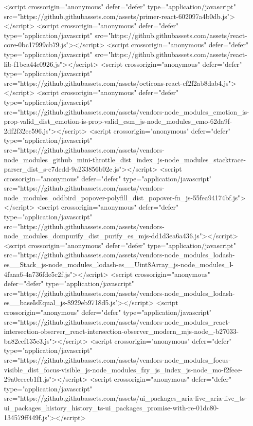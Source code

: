   <script crossorigin="anonymous" defer="defer" type="application/javascript" src="https://github.githubassets.com/assets/primer-react-602097a4b0db.js"></script>
<script crossorigin="anonymous" defer="defer" type="application/javascript" src="https://github.githubassets.com/assets/react-core-0bc17999cb79.js"></script>
<script crossorigin="anonymous" defer="defer" type="application/javascript" src="https://github.githubassets.com/assets/react-lib-f1bca44e0926.js"></script>
<script crossorigin="anonymous" defer="defer" type="application/javascript" src="https://github.githubassets.com/assets/octicons-react-cf2f2ab8dab4.js"></script>
<script crossorigin="anonymous" defer="defer" type="application/javascript" src="https://github.githubassets.com/assets/vendors-node_modules_emotion_is-prop-valid_dist_emotion-is-prop-valid_esm_js-node_modules_emo-62da9f-2df2f32ec596.js"></script>
<script crossorigin="anonymous" defer="defer" type="application/javascript" src="https://github.githubassets.com/assets/vendors-node_modules_github_mini-throttle_dist_index_js-node_modules_stacktrace-parser_dist_s-e7dcdd-9a233856b02c.js"></script>
<script crossorigin="anonymous" defer="defer" type="application/javascript" src="https://github.githubassets.com/assets/vendors-node_modules_oddbird_popover-polyfill_dist_popover-fn_js-55fea94174bf.js"></script>
<script crossorigin="anonymous" defer="defer" type="application/javascript" src="https://github.githubassets.com/assets/vendors-node_modules_dompurify_dist_purify_es_mjs-dd1d3ea6a436.js"></script>
<script crossorigin="anonymous" defer="defer" type="application/javascript" src="https://github.githubassets.com/assets/vendors-node_modules_lodash-es__Stack_js-node_modules_lodash-es__Uint8Array_js-node_modules_l-4faaa6-4a736fde5c2f.js"></script>
<script crossorigin="anonymous" defer="defer" type="application/javascript" src="https://github.githubassets.com/assets/vendors-node_modules_lodash-es__baseIsEqual_js-8929eb9718d5.js"></script>
<script crossorigin="anonymous" defer="defer" type="application/javascript" src="https://github.githubassets.com/assets/vendors-node_modules_react-intersection-observer_react-intersection-observer_modern_mjs-node_-b27033-ba82cef135e3.js"></script>
<script crossorigin="anonymous" defer="defer" type="application/javascript" src="https://github.githubassets.com/assets/vendors-node_modules_focus-visible_dist_focus-visible_js-node_modules_fzy_js_index_js-node_mo-f2fece-29a0ceccb1f1.js"></script>
<script crossorigin="anonymous" defer="defer" type="application/javascript" src="https://github.githubassets.com/assets/ui_packages_aria-live_aria-live_ts-ui_packages_history_history_ts-ui_packages_promise-with-re-01dc80-134579ff449f.js"></script>
